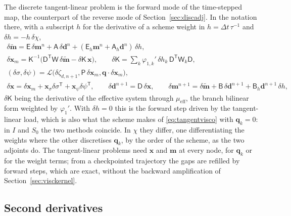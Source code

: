 \documentclass[11pt,a4paper]{article}
\numberwithin{equation}{section}
\begin{document}
The discrete tangent-linear problem is the forward mode of the time-stepped
map, the counterpart of the reverse mode of Section~\ref{sec:discadj}. In the
notation there, with a subscript $h$ for the derivative of a scheme weight in
$h = \Delta t\,\tau^{-1}$ and $\delta h = -h\,\delta\chi$,
\begin{gather*}
\delta\tilde{\mathbf{m}} = \mathsf{E}\,\delta\mathbf{m}^{n} + \mathsf{A}\,\delta\mathbf{d}^{n}
 + (\mathsf{E}_{h}\mathbf{m}^{n} + \mathsf{A}_{h}\mathbf{d}^{n})\,\delta h,\\
\delta\mathbf{x}_{m} = \mathsf{K}^{-1}\big(\mathsf{D}^{\mathsf T}\mathsf{W}\,\delta\tilde{\mathbf{m}}
 - \delta\mathsf{K}\,\mathbf{x}\big),\qquad
\delta\mathsf{K} = \sum_{k}\varphi_{1,k}'\,\delta h_{k}\,\mathsf{D}^{\mathsf T}\mathsf{W}_{k}\mathsf{D},\\
(\delta\sigma,\delta\psi) = \mathcal{L}\big(\delta\zeta_{d,n+1}, \mathsf{P}\,\delta\mathbf{x}_{m}, \mathbf{q}\cdot\delta\mathbf{x}_{m}\big),\\
\delta\mathbf{x} = \delta\mathbf{x}_{m} + \mathbf{x}_{\sigma}\delta\sigma^{\mathsf T} + \mathbf{x}_{\psi}\delta\psi^{\mathsf T},\qquad
\delta\mathbf{d}^{n+1} = \mathsf{D}\,\delta\mathbf{x},\qquad
\delta\mathbf{m}^{n+1} = \delta\tilde{\mathbf{m}} + \mathsf{B}\,\delta\mathbf{d}^{n+1} + \mathsf{B}_{h}\mathbf{d}^{n+1}\,\delta h,
\end{gather*}
$\delta\mathsf{K}$ being the derivative of the effective system through
$\mu_{\mathrm{eff}}$, the branch bilinear form weighted by $\varphi_{1}'$. With
$\delta h = 0$ this is the forward step driven by the tangent-linear load,
which is also what the scheme makes of \eqref{eq:tangentvisco} with
$\mathbf{q}_{k}=0$: in $I$ and $S_{0}$ the two methods coincide. In $\chi$ they
differ, one differentiating the weights where the other discretises
$\mathbf{q}_{k}$, by the order of the scheme, as the two adjoints do. The
tangent-linear problems need $\mathbf{x}$ and $\mathbf{m}$ at every node, for
$\mathbf{q}_{k}$ or for the weight terms; from a checkpointed trajectory the
gaps are refilled by forward steps, which are exact, without the backward
amplification of Section~\ref{sec:visckernel}.

\subsection{Second derivatives}
\label{sec:second}
\end{document}
